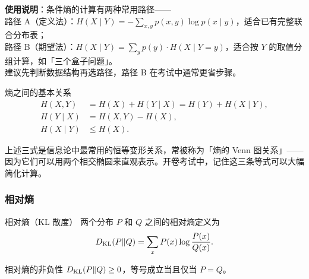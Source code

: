 \noindent \textbf{使用说明}：条件熵的计算有两种常用路径——\\[2pt]
路径 A（定义法）：$H(X\mid Y)=-\sum_{x,y}p(x,y)\log p(x\mid y)$，适合已有完整联合分布表；\\
路径 B（期望法）：$H(X\mid Y)=\sum_{y}p(y)\cdot H(X\mid Y=y)$，适合按 $Y$ 的取值分组计算，如「三个盒子问题」。\\
建议先判断数据结构再选路径，路径 B 在考试中通常更省步骤。

\begin{formulaBox}{熵之间的基本关系}
\begin{align*}
  H(X,Y) &= H(X) + H(Y \mid X) = H(Y) + H(X \mid Y), \\
  H(Y \mid X) &= H(X,Y) - H(X), \\
  H(X \mid Y) &\le H(X).
\end{align*}
\end{formulaBox}

\begin{center}
\end{center}

上述三式是信息论中最常用的恒等变形关系，常被称为「熵的 Venn 图关系」——因为它们可以用两个相交椭圆来直观表示。开卷考试中，记住这三条等式可以大幅简化计算。

\subsubsection{相对熵}
\begin{definitionBox}{相对熵（KL 散度）}
两个分布 $P$ 和 $Q$ 之间的相对熵定义为
\[
D_{\mathrm{KL}}(P\|Q) = \sum_x P(x) \log \frac{P(x)}{Q(x)}.
\]
\end{definitionBox}

\begin{theoremBox}{相对熵的非负性}
$D_{\mathrm{KL}}(P\|Q) \ge 0$，等号成立当且仅当 $P=Q$。
\end{theoremBox}

